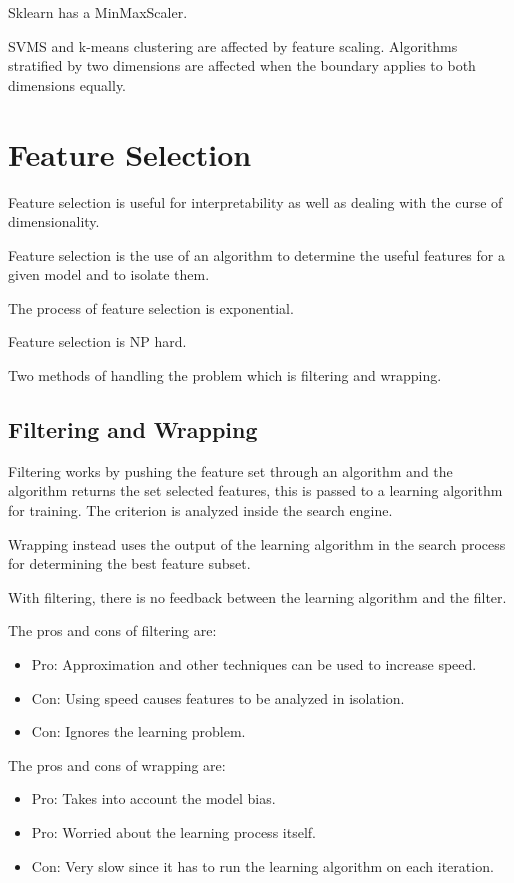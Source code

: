 \documentclass{article}
\begin{document}
Sklearn has a MinMaxScaler. 

SVMS and k-means clustering are affected by feature scaling. Algorithms 
stratified by two dimensions are affected when the boundary applies to both 
dimensions equally. 

\section{Feature Selection}

Feature selection is useful for interpretability as well as dealing with the 
curse of dimensionality. 

Feature selection is the use of an algorithm to determine the useful features 
for a given model and to isolate them. 

The process of feature selection is exponential. 

Feature selection is NP hard. 

Two methods of handling the problem which is filtering and wrapping.

\subsection{Filtering and Wrapping}

Filtering works by pushing the feature set through an algorithm and the
algorithm returns the set selected features, this is passed to a learning
algorithm for training. The criterion is analyzed inside the search engine. 

Wrapping instead uses the output of the learning algorithm in the search process
for determining the best feature subset. 

With filtering, there is no feedback between the learning algorithm and the 
filter. 

The pros and cons of filtering are:
\begin{itemize}
	\item Pro: Approximation and other techniques can be used to increase 
		speed.
	\item Con: Using speed causes features to be analyzed in isolation. 
	\item Con: Ignores the learning problem. 
\end{itemize}

The pros and cons of wrapping are:
\begin{itemize}
	\item Pro: Takes into account the model bias. 
	\item Pro: Worried about the learning process itself. 
	\item Con: Very slow since it has to run the learning algorithm on each 
		iteration. 
\end{itemize}
\end{document}
